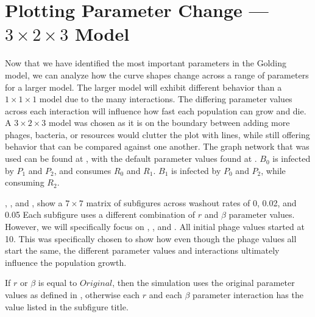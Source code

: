 \section{Plotting Parameter Change — $3\times 2\times 3$ Model}
Now that we have identified the most important parameters in the Golding model, we can analyze how the curve shapes change across a range of parameters for a larger model. 
The larger model will exhibit different behavior than a $1\times 1\times 1$ model due to the many interactions. 
The differing parameter values across each interaction will influence how fast each population can grow and die. 
A $3\times 2\times 3$ model was chosen as it is on the boundary between adding more phages, bacteria, or resources would clutter the plot with lines, while still offering behavior that can be compared against one another. 
The graph network that was used can be found at , with the default parameter values found at . 
$B_0$ is infected by $P_1$ and $P_2$, and consumes $R_0$ and $R_1$. 
$B_1$ is infected by $P_0$ and $P_2$, while consuming $R_2$. 


, , and , show a $7\times7$ matrix of subfigures across washout rates of 0, 0.02, and 0.05
Each subfigure uses a different combination of $r$ and $\beta$ parameter values. 
However, we will specifically focus on , , and . 
All initial phage values started at 10. 
This was specifically chosen to show how even though the phage values all start the same, the different parameter values and interactions ultimately influence the population growth. 

If $r$ or $\beta$ is equal to $Original$, then the simulation uses the original parameter values as defined in , otherwise each $r$ and each $\beta$ parameter interaction has the value listed in the subfigure title. 

